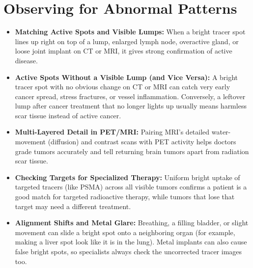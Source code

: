 \section{Observing for Abnormal Patterns}
\begin{itemize}
    \item \textbf{Matching Active Spots and Visible Lumps:} When a bright tracer spot lines up right on top of a lump, enlarged lymph node, overactive gland, or loose joint implant on CT or MRI, it gives strong confirmation of active disease.
    \item \textbf{Active Spots Without a Visible Lump (and Vice Versa):} A bright tracer spot with no obvious change on CT or MRI can catch very early cancer spread, stress fractures, or vessel inflammation. Conversely, a leftover lump after cancer treatment that no longer lights up usually means harmless scar tissue instead of active cancer.
    \item \textbf{Multi-Layered Detail in PET/MRI:} Pairing MRI's detailed water-movement (diffusion) and contrast scans with PET activity helps doctors grade tumors accurately and tell returning brain tumors apart from radiation scar tissue.
    \item \textbf{Checking Targets for Specialized Therapy:} Uniform bright uptake of targeted tracers (like PSMA) across all visible tumors confirms a patient is a good match for targeted radioactive therapy, while tumors that lose that target may need a different treatment.
    \item \textbf{Alignment Shifts and Metal Glare:} Breathing, a filling bladder, or slight movement can slide a bright spot onto a neighboring organ (for example, making a liver spot look like it is in the lung). Metal implants can also cause false bright spots, so specialists always check the uncorrected tracer images too.
\end{itemize}

